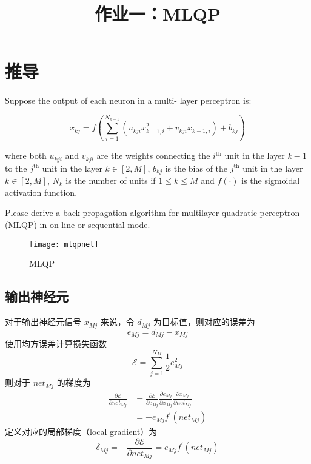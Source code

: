 \endofdump
{}

    \title{作业一：MLQP}
    \maketitle

    \tableofcontents
    \clearpage

    \section{推导}
    \begin{problem}
        Suppose the output of each neuron in a multi-
layer perceptron is:

\begin{equation}\label{eq:def}
    x_{kj} = f\left(\sum_{i=1}^{N_{k-1}}(u_{kji}x_{k-1,i}^2+v_{kji}x_{k-1,i})+b_{kj}\right)
\end{equation}

where both $u_{kji}$ and $v_{kji}$ are the weights connecting the $i^\text{th}$ unit in the layer $k-1$ to the $j^\text{th}$ unit in the layer $k\in[2,M]$, $b_{kj}$ is 
the bias of the $j^\text{th}$ unit in the layer $k\in[2,M]$, $N_k$ is the number of 
units  if $1\leq k\leq M$ and $f(\cdot)$ is the sigmoidal activation 
function. 

Please derive a back-propagation algorithm for multilayer 
quadratic perceptron (MLQP) in on-line or sequential 
mode.
    \end{problem}

    \begin{figure}[h]
        \centering
        \texttt{[image: mlqpnet]}
        \caption{MLQP}\label{fig:mlqp}
    \end{figure}

    \subsection{输出神经元}
        对于输出神经元信号 $x_{Mj}$ 来说，令 $d_{Mj}$ 为目标值，则对应的误差为
        \begin{equation*}
            e_{Mj} = d_{Mj} - x_{Mj}
        \end{equation*}
        使用均方误差计算损失函数
        \begin{equation}\label{eq:loss}
            \mathcal{E} = \sum_{j=1}^{N_{M}}\frac{1}{2}e_{Mj}^2
        \end{equation}
        则对于 $\mathit{net}_{Mj}$ 的梯度为
        \begin{align*}
            \frac{\partial\mathcal{E}}{\partial net_{Mj}} &= \frac{\partial\mathcal{E}}{\partial e_{Mj}}\frac{\partial e_{Mj}}{\partial x_{Mj}}\frac{\partial x_{Mj}}{\partial \mathit{net}_{Mj}} \\
            &= -e_{Mj}f^\prime(\mathit{net}_{Mj})
        \end{align*}
        定义对应的局部梯度（local gradient）为
        \begin{equation}\label{eq:outlocalgrad}
            \delta_{Mj} = -\frac{\partial\mathcal{E}}{\partial net_{Mj}} = e_{Mj}f^\prime(\mathit{net}_{Mj})
        \end{equation}
